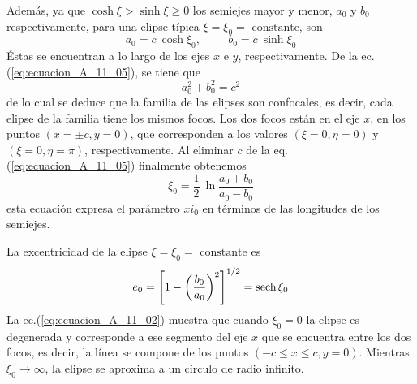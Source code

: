 Además, ya que $\cosh \xi > \sinh \xi \geq 0$ los semiejes mayor y menor, $a_{0}$ y $b_{0}$ respectivamente, para una elipse típica $\xi = \xi_{0} = \mbox{ constante}$, son
\begin{equation}
    a_{0} = c \: \cosh \xi_{0}, \hspace{1cm} b_{0} = c \: \sinh \xi_{0}
    \label{eq:ecuacion_A_11_05}
\end{equation}
Éstas se encuentran a lo largo de los ejes $x$ e $y$, respectivamente. De la ec. (\ref{eq:ecuacion_A_11_05}), se tiene que
\begin{equation}
    a_{0}^{2} + b_{0}^{2} =  c^{2}
    \label{eq:ecuacion_A_11_16}
\end{equation}
de lo cual se deduce que la familia de las elipses son confocales, es decir, cada elipse de la familia tiene los mismos focos. Los dos focos están en el eje $x$, en los puntos $(x = \pm c, y = 0)$, que corresponden a los valores $(\xi=0, \eta = 0)$ y $(\xi = 0, \eta = \pi)$, respectivamente. Al eliminar $c$ de la eq. (\ref{eq:ecuacion_A_11_05}) finalmente obtenemos
\begin{equation}
    \xi_{0} = \dfrac{1}{2} \: \ln \dfrac{a_{0} + b_{0}}{a_{0} - b_{0}}
    \label{eq:ecuacion_A_11_07}
\end{equation}
esta ecuación expresa el parámetro $xi_{0}$ en términos de las longitudes de los semiejes.

La excentricidad de la elipse $\xi = \xi_{0} = \mbox{ constante}$ es
\begin{equation}
    e_{0} = \left[ 1 - \left(\dfrac{b_{0}}{a_{0}} \right)^{2} \right]^{1/2} = \mathrm{sech} \, \xi_{0}
    \label{eq:ecuacion_A_11_08}
\end{equation}
La ec.(\ref{eq:ecuacion_A_11_02}) muestra que cuando $\xi_{0} = 0$ la elipse es degenerada y corresponde a ese segmento del eje $x$ que se encuentra entre los dos focos,  es decir, la línea se compone de los puntos $(-c \leq x \leq c, y = 0)$. Mientras $\xi_{0} \to \infty$, la elipse se aproxima a un círculo de radio infinito.
